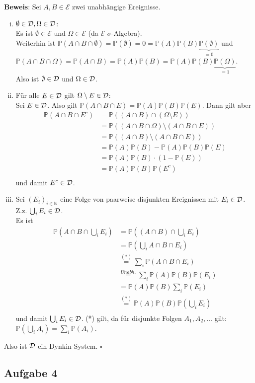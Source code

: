 \documentclass[11pt,a4paper,ngerman]{article}
\newcommand{\Prob}{\mathbb{P}}
\newcommand{\Epsilon}{\mathcal{E}}
\begin{document}
\textbf{Beweis}: Sei  $A,B \in \Epsilon$ zwei unabhängige Ereignisse.
\begin{enumerate}[(i)]
\item $\emptyset \in \mathcal{D}, \Omega \in \mathcal{D}$: \\
Es ist $\emptyset \in \Epsilon$ und $\Omega \in \Epsilon$ (da $\Epsilon$ $\sigma$-Algebra). \\
Weiterhin ist $\Prob(A \cap B \cap \emptyset) = \Prob(\emptyset) = 0 = \Prob(A) \Prob(B) \underbrace{\Prob(\emptyset)}_{=0}$ und \\
$\Prob(A \cap B \cap \Omega) = \Prob(A \cap B) = \Prob(A) \Prob(B) =  \Prob(A) \Prob(B) \underbrace{\Prob(\Omega)}_{=1}$. \\
Also ist $\emptyset \in \mathcal{D}$ und $\Omega \in \mathcal{D}$.
\item Für alle $E \in \mathcal{D}$ gilt  $\Omega \setminus E \in \mathcal{D}$: \\
Sei $E \in \mathcal{D}$. Also gilt $\Prob(A \cap B \cap E) = \Prob(A) \Prob(B) \Prob(E)$. Dann gilt aber
\begin{equation*}\begin{split}
 \Prob(A \cap B \cap E^c) &=  \Prob((A \cap B) \cap (\Omega \setminus E)) \\
&=  \Prob((A \cap B \cap \Omega) \setminus (A \cap B \cap E)) \\
&= \Prob((A \cap B) \setminus (A \cap B \cap E)) \\
&=  \Prob(A)\Prob(B) - \Prob(A)\Prob(B)\Prob(E) \\
&= \Prob(A)\Prob(B) \cdot (1 - \Prob(E)) \\
&= \Prob(A)\Prob(B) \Prob(E^c) \\
\end{split}\end{equation*}
und damit $E^c \in \mathcal{D}$.
\item Sei $\left( E_i \right)_{i \in \mathbb{N}}$ eine Folge von paarweise disjunkten Ereignissen mit $E_i \in \mathcal{D}$. \\
Z.z. $\bigcup_i E_i \in \mathcal{D}$. \\
Es ist
\begin{equation*}\begin{split}
 \Prob(A \cap B \cap \bigcup_i E_i) &=  \Prob((A \cap B) \cap \bigcup_i E_i) \\
&= \Prob(\bigcup_i A \cap B \cap E_i) \\
&\stackrel{(*)}{=} \sum_i \Prob(A \cap B \cap E_i) \\
&\stackrel{Unabh.}{=} \sum_i \Prob(A) \Prob(B) \Prob(E_i) \\
&= \Prob(A)\Prob(B) \sum_i \Prob(E_i) \\
&\stackrel{(*)}{=} \Prob(A)\Prob(B) \Prob(\bigcup_i E_i) \\
\end{split}\end{equation*}
und damit $\bigcup_i E_i \in \mathcal{D}$.
(*) gilt, da für disjunkte Folgen $A_1, A_2, \ldots$ gilt: $\Prob(\bigcup_i A_i) = \sum_i \Prob(A_i)$.
\end{enumerate}
Also ist $\mathcal{D}$ ein Dynkin-System.
\mbox{} \hfill $\square$
\subsection*{Aufgabe 4}


\label{LastPage}
\end{document}
